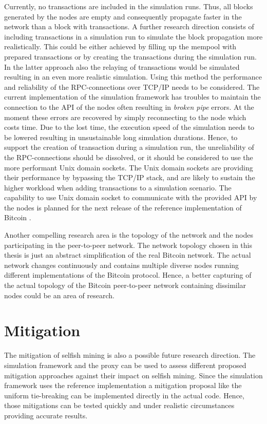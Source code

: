 Currently, no transactions are included in the simulation runs.
Thus, all blocks generated by the nodes are empty and consequently propagate faster in the network than a block with transactions.
A further research direction consists of including transactions in a simulation run to simulate the block propagation more realistically.
This could be either achieved by filling up the mempool with prepared transactions or by creating the transactions during the simulation run.
In the latter approach also the relaying of transactions would be simulated resulting in an even more realistic simulation.
Using this method the performance and reliability of the RPC-connections over TCP/IP needs to be considered.
The current implementation of the simulation framework has troubles to maintain the connection to the API of the nodes often resulting in \textit{broken pipe} errors.
At the moment these errors are recovered by simply reconnecting to the node which costs time.
Due to the lost time, the execution speed of the simulation needs to be lowered resulting in unsustainable long simulation durations.
Hence, to support the creation of transaction during a simulation run, the unreliability of the RPC-connections should be dissolved, or it should be considered to use the more performant Unix domain sockets.
The Unix domain sockets are providing their performance by bypassing the TCP/IP stack, and are likely to sustain the higher workload when adding transactions to a simulation scenario.
The capability to use Unix domain socket to communicate with the provided API by the nodes is planned for the next release of the reference implementation of Bitcoin \cite{bitcoinunixdomainsockets}.

Another compelling research area is the topology of the network and the nodes participating in the peer-to-peer network.
The network topology chosen in this thesis is just an abstract simplification of the real Bitcoin network.
The actual network changes continuously and contains multiple diverse nodes running different implementations of the Bitcoin protocol.
Hence, a better capturing of the actual topology of the Bitcoin peer-to-peer network containing dissimilar nodes could be an area of research.

\section{Mitigation}

The mitigation of selfish mining is also a possible future research direction.
The simulation framework and the proxy can be used to assess different proposed mitigation approaches \cite{eyal2014majority, billah2015one, solat2016zeroblock, zhang2017publish} against their impact on selfish mining.
Since the simulation framework uses the reference implementation a mitigation proposal like the uniform tie-breaking \cite{eyal2014majority} can be implemented directly in the actual code.
Hence, those mitigations can be tested quickly and under realistic circumstances providing accurate results.
